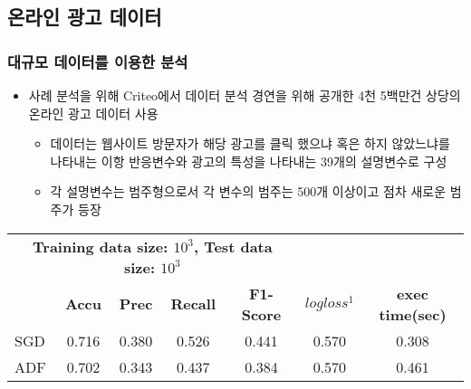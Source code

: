 \documentclass{beamer}
\begin{document}







\subsection{온라인 광고 데이터} %

\begin{frame}
\frametitle{대규모 데이터를 이용한 분석}


\begin{itemize}
\item 사례 분석을 위해 Criteo에서 데이터 분석 경연을 위해 공개한 4천 5백만건 상당의 온라인 광고 데이터 사용
    {\footnotesize
    \begin{itemize}
    [circle]
    \item 데이터는 웹사이트 방문자가 해당 광고를 클릭 했으냐 혹은 하지 않았느냐를 나타내는 이항 반응변수와 광고의 특성을 나타내는 39개의 설명변수로 구성
    \item 각 설명변수는 범주형으로서 각 변수의 범주는 500개 이상이고 점차 새로운 범주가 등장
    \end{itemize}
    }
\end{itemize}

{\scriptsize
	\begin{center}%
	\begin{tabular}{ccccccc}
	\hline\hline %

    \multicolumn{5}{c}{\textbf{Training data size: $10^3$, Test data size: $10^3$}} & \textbf{} & \textbf{} \\

	\textbf{} & \textbf{Accu} & \textbf{Prec} & \textbf{Recall} & \textbf{F1-Score} & \textbf{$logloss^1$} & \textbf{exec time(sec)} \\

	\hline %
	
	\multicolumn {1}{l|}{SGD} & 0.716 & 0.380 & 0.526 & 0.441 & 0.570 & 0.308 \\ \hline
	\multicolumn {1}{l|}{ADF} & 0.702 & 0.343 & 0.437 & 0.384 & 0.570 & 0.461 \\ \hline

	\hline %
	\end{tabular}
    \end{center}
}


\end{frame}
\end{document}
